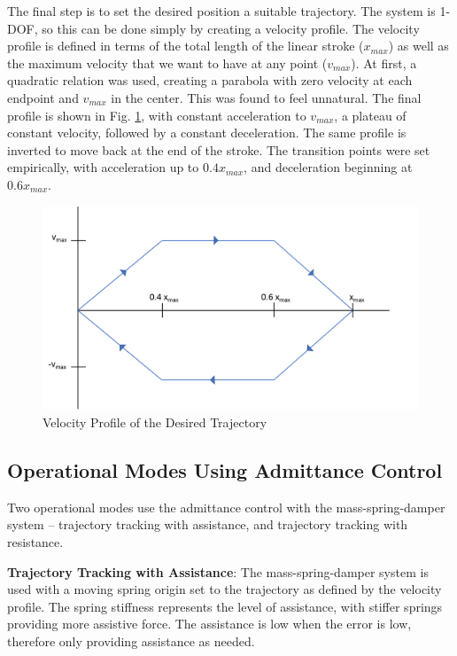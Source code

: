 \documentclass[12pt]{report}
\begin{document}
	The final step is to set the desired position a suitable trajectory. The system is 1-DOF, so this can be done simply by creating a velocity profile. The velocity profile is defined in terms of the total length of the linear stroke ($x_{max}$) as well as the maximum velocity that we want to have at any point ($v_{max}$). At first, a quadratic relation was used, creating a parabola with zero velocity at each endpoint and $v_{max}$ in the center. This was found to feel unnatural. The final profile is shown in Fig. \ref{fig:velocity_profile}, with constant acceleration to $v_{max}$, a plateau of constant velocity, followed by a constant deceleration. The same profile is inverted to move back at the end of the stroke. The transition points were set empirically, with acceleration up to $0.4 x_{max}$, and deceleration beginning at $0.6 x_{max}$. 
	
	\begin{figure}[h] 
		\centering
		\includegraphics[width=0.75\linewidth]{velocity_profile}
		\caption{Velocity Profile of the Desired Trajectory}
		\label{fig:velocity_profile}
	\end{figure}
	
	
	
	\subsection{Operational Modes Using Admittance Control}
	
	Two operational modes use the admittance control with the mass-spring-damper system -- trajectory tracking with assistance, and trajectory tracking with resistance. 
	
	\textbf{Trajectory Tracking with Assistance}: The mass-spring-damper system is used with a moving spring origin set to the trajectory as defined by the velocity profile. The spring stiffness represents the level of assistance, with stiffer springs providing more assistive force. The assistance is low when the error is low, therefore only providing assistance as needed. 
	
\end{document}
